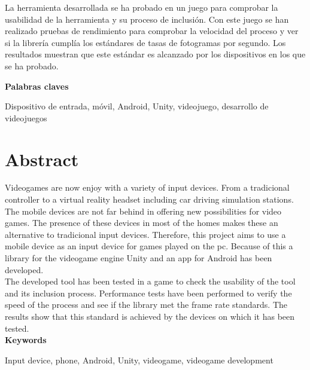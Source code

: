 La herramienta desarrollada se ha probado en un juego para comprobar la usabilidad de la herramienta y su proceso de inclusi\'on. Con este juego se han realizado pruebas de rendimiento para comprobar la velocidad del proceso y ver si la librer\'ia cumpl\'ia los est\'andares de tasas de fotogramas por segundo. Los resultados muestran que este est\'andar es alcanzado por los dispositivos en los que se ha probado.

\addvspace{1cm}


\Large{\textbf{Palabras claves}}
\normalsize

\addvspace{1cm}

Dispositivo de entrada, m\'ovil, Android, Unity, videojuego, desarrollo de videojuegos


\chapter{Abstract}

Videogames are now enjoy with a variety of input devices. From a tradicional controller to a virtual reality headset including car driving simulation stations. The mobile devices are not far behind in offering new possibilities for video games. The presence of these devices in most of the homes makes these an alternative to tradicional input devices. Therefore, this project aims to use a mobile device as an input device for games played on the pc. Because of this a library for the videogame engine Unity and an app for Android has been developed.\\

The developed tool has been tested in a game to check the usability of the tool and its inclusion process. Performance tests have been performed to verify the speed of the process and see if the library met the frame rate standards. The results show that this standard is achieved by the devices on which it has been tested.\\

\huge{\textbf{Keywords}}
\normalsize

\addvspace{1cm}

Input device, phone, Android, Unity, videogame, videogame development

\endinput

